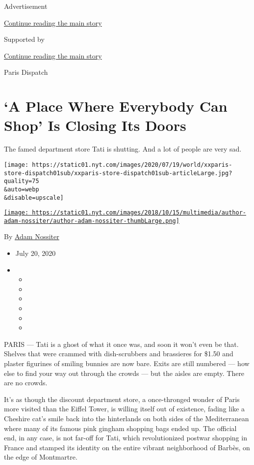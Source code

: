 Advertisement

\protect\hyperlink{after-top}{Continue reading the main story}

Supported by

\protect\hyperlink{after-sponsor}{Continue reading the main story}

Paris Dispatch

\hypertarget{a-place-where-everybody-can-shop-is-closing-its-doors}{%
\section{`A Place Where Everybody Can Shop' Is Closing Its
Doors}\label{a-place-where-everybody-can-shop-is-closing-its-doors}}

The famed department store Tati is shutting. And a lot of people are
very sad.

\texttt{[image: https://static01.nyt.com/images/2020/07/19/world/xxparis-store-dispatch01sub/xxparis-store-dispatch01sub-articleLarge.jpg?quality=75\\\&auto=webp\\\&disable=upscale]}

\href{https://www.nytimes.com/by/adam-nossiter}{\texttt{[image: https://static01.nyt.com/images/2018/10/15/multimedia/author-adam-nossiter/author-adam-nossiter-thumbLarge.png]}}

By \href{https://www.nytimes.com/by/adam-nossiter}{Adam Nossiter}

\begin{itemize}
\item
  July 20, 2020
\item
  \begin{itemize}
  \item
  \item
  \item
  \item
  \item
  \item
  \end{itemize}
\end{itemize}

PARIS --- Tati is a ghost of what it once was, and soon it won't even be
that. Shelves that were crammed with dish-scrubbers and brassieres for
\$1.50 and plaster figurines of smiling bunnies are now bare. Exits are
still numbered --- how else to find your way out through the crowds ---
but the aisles are empty. There are no crowds.

It's as though the discount department store, a once-thronged wonder of
Paris more visited than the Eiffel Tower, is willing itself out of
existence, fading like a Cheshire cat's smile back into the hinterlands
on both sides of the Mediterranean where many of its famous pink gingham
shopping bags ended up. The official end, in any case, is not far-off
for Tati, which revolutionized postwar shopping in France and stamped
its identity on the entire vibrant neighborhood of Barbès, on the edge
of Montmartre.

